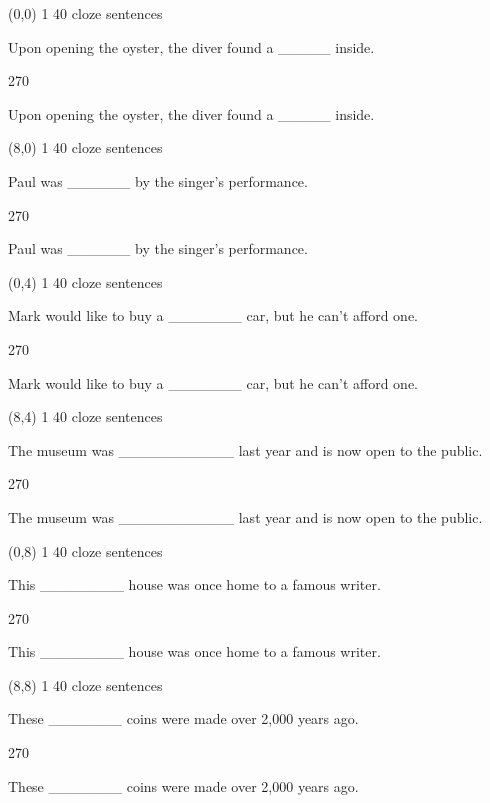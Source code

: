 \documentclass[a4paper]{article}
\newenvironment{itemize*}%
{\begin{itemize}%
 \setlength{\itemsep}{0.5cm}%
 \setlength{\parsep}{0pt}%
 \setlength{\parskip}{0pt}}%
{\end{itemize}}
\newcommand{\mycard}[3]{%
	\small #1 #2
	\par
	\parbox[t][6.8cm][c]{9.5cm}{%
	\par
	\myleft{#3}
	\par
	\myright{#3}
	}
}
\newcommand{\myleft}[1]{%
	\begin{sideways}
	\hspace*{-0.9cm}
		\parbox[t][2.7cm][t]{6.5cm}{%
		\large #1
		}
	\end{sideways}
}
\newcommand{\myright}[1]{%
	\hspace*{6.5cm}
	\begin{turn}{270}
	\hspace*{-7.1cm}
		\parbox[t][2.7cm][t]{6.5cm}{%
		\large #1
		}
	\end{turn}
}
\begin{document}
\begin{textblock}{8}(0,0)
\mycard{1}{40 cloze sentences}{
\begin{itemize*}
\item Upon opening the oyster, the diver found a \_\_\_\_\_ inside.
\end{itemize*}
}
\end{textblock}

\begin{textblock}{8}(8,0)
\mycard{1}{40 cloze sentences}{
\begin{itemize*}
\item Paul was \_\_\_\_\_\_ by the singer's performance.
\end{itemize*}
}
\end{textblock}

\begin{textblock}{8}(0,4)
\mycard{1}{40 cloze sentences}{
\begin{itemize*}
\item Mark would like to buy a \_\_\_\_\_\_\_ car, but he can't afford one.
\end{itemize*}
}
\end{textblock}

\begin{textblock}{8}(8,4)
\mycard{1}{40 cloze sentences}{
\begin{itemize*}
\item The museum was \_\_\_\_\_\_\_\_\_\_\_ last year and is now open to the public.
\end{itemize*}
}
\end{textblock}

\begin{textblock}{8}(0,8)
\mycard{1}{40 cloze sentences}{
\begin{itemize*}
\item This \_\_\_\_\_\_\_\_ house was once home to a famous writer.
\end{itemize*}
}
\end{textblock}

\begin{textblock}{8}(8,8)
\mycard{1}{40 cloze sentences}{
\begin{itemize*}
\item These \_\_\_\_\_\_\_ coins were made over 2,000 years ago.
\end{itemize*}
}
\end{textblock}
\end{document}
